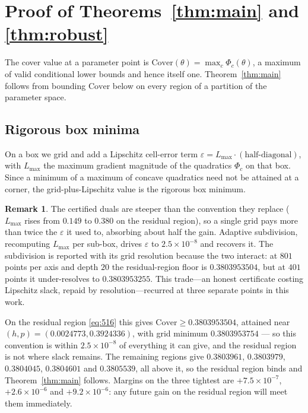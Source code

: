 \documentclass[11pt]{article}
\theoremstyle{definition}
\newtheorem{remark}[theorem]{Remark}
\begin{document}
\section{Proof of Theorems~\ref{thm:main} and \ref{thm:robust}}

The cover value at a parameter point is
$\mathrm{Cover}(\theta) = \max_c \Phi_c(\theta)$, a maximum of valid
conditional lower bounds and hence itself one. Theorem~\ref{thm:main}
follows from bounding $\mathrm{Cover}$ below on every region of a
partition of the parameter space.

\subsection{Rigorous box minima}

On a box we grid and add a Lipschitz cell-error term
$\varepsilon = L_{\max}\cdot(\text{half-diagonal})$, with $L_{\max}$ the
maximum gradient magnitude of the quadratics $\Phi_c$ on that box. Since
a minimum of a maximum of concave quadratics need not be attained at a
corner, the grid-plus-Lipschitz value is the rigorous box minimum.

\begin{remark}
The certified duals are steeper than the convention they replace
($L_{\max}$ rises from $0.149$ to $0.380$ on the residual region), so a
single grid pays more than twice the $\varepsilon$ it used to, absorbing
about half the gain. Adaptive subdivision, recomputing $L_{\max}$ per
sub-box, drives $\varepsilon$ to $2.5\times10^{-8}$ and recovers it.
The subdivision is reported with its grid resolution because the two
interact: at $801$ points per axis and depth $20$ the residual-region
floor is $0.3803953504$, but at $401$ points it under-resolves to
$0.3803953255$.
This trade---an honest certificate costing Lipschitz slack, repaid by
resolution---recurred at three separate points in this work.
\end{remark}

On the residual region \eqref{eq:516} this gives
$\mathrm{Cover} \ge 0.3803953504$, attained near
$(h,p) = (0.0024773, 0.3924336)$, with grid minimum $0.3803953754$ --- so
this convention is within $2.5\times10^{-8}$ of everything it can give,
and the residual region is not where slack remains. The remaining
regions give $0.3803961$, $0.3803979$, $0.3804045$, $0.3804601$ and
$0.3805539$, all above it, so the residual region binds and
Theorem~\ref{thm:main} follows. Margins on the three tightest are
$+7.5\times10^{-7}$, $+2.6\times10^{-6}$ and $+9.2\times10^{-6}$: any
future gain on the residual region will meet them immediately.
\end{document}

